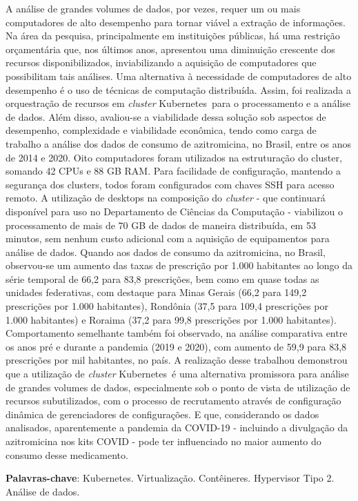 
\begin{resumo}

    A análise de grandes volumes de dados, por vezes, requer um ou mais computadores de alto desempenho para tornar viável a extração de informações. Na área da pesquisa, principalmente em instituições públicas, há uma restrição orçamentária que, nos últimos anos, apresentou uma diminuição crescente dos recursos disponibilizados, inviabilizando a aquisição de computadores que possibilitam tais análises. Uma alternativa à necessidade de computadores de alto desempenho é o uso de técnicas de computação distribuída. Assim, foi realizada a orquestração de recursos em \emph{cluster} Kubernetes\textregistered\ para o processamento e a análise de dados. Além disso, avaliou-se a viabilidade dessa solução sob aspectos de desempenho, complexidade e viabilidade econômica, tendo como carga de trabalho a análise dos dados de consumo de azitromicina, no Brasil, entre os anos de 2014 e 2020.  Oito computadores foram utilizados na estruturação do cluster, somando 42 CPUs e 88 GB RAM. Para facilidade de configuração, mantendo a segurança dos clusters, todos foram configurados com chaves SSH para acesso remoto. A utilização de desktops na composição do \emph{cluster} - que continuará disponível para uso no Departamento de Ciências da Computação - viabilizou o processamento de mais de 70 GB de dados de maneira distribuída, em 53 minutos, sem nenhum custo adicional com a aquisição de equipamentos para análise de dados. Quando aos dados de consumo da azitromicina, no Brasil, observou-se um aumento das taxas de prescrição por 1.000 habitantes ao longo da série temporal de 66,2 para 83,8 prescrições, bem como em quase todas as unidades federativas, com destaque para Minas Gerais (66,2 para 149,2 prescrições por 1.000 habitantes), Rondônia (37,5 para 109,4 prescrições por 1.000 habitantes) e Roraima (37,2 para 99,8 prescrições por 1.000 habitantes). Comportamento semelhante também foi observado, na análise comparativa entre os anos pré e durante a pandemia (2019 e 2020), com aumento de 59,9 para 83,8 prescrições por mil habitantes, no país. A realização desse trabalhou demonstrou que a utilização de \emph{cluster} Kubernetes\textregistered\ é uma alternativa promissora para análise de grandes volumes de dados, especialmente sob o ponto de vista de utilização de recursos subutilizados, com o processo de recrutamento através de configuração dinâmica de gerenciadores de configurações. E que, considerando os dados analisados, aparentemente a pandemia da COVID-19 - incluindo a divulgação da azitromicina nos kits COVID - pode ter influenciado no maior aumento do consumo desse medicamento.


    \textbf{Palavras-chave}: Kubernetes\textregistered. Virtualização. Contêineres. Hypervisor Tipo 2. Análise de dados.
\end{resumo}

